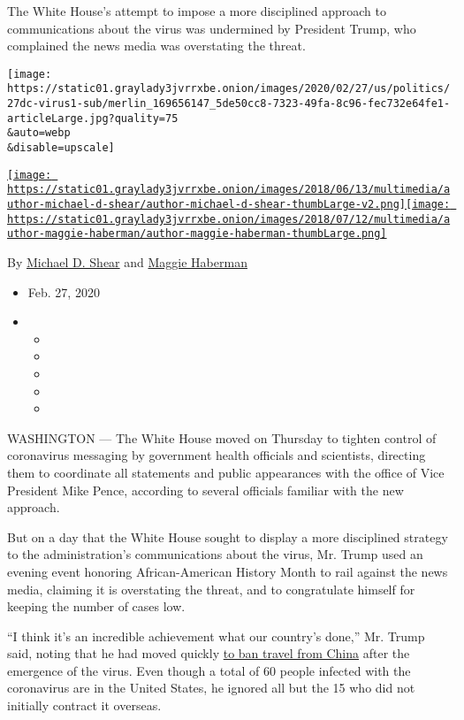 The White House's attempt to impose a more disciplined approach to
communications about the virus was undermined by President Trump, who
complained the news media was overstating the threat.

\texttt{[image: https://static01.graylady3jvrrxbe.onion/images/2020/02/27/us/politics/27dc-virus1-sub/merlin\_169656147\_5de50cc8-7323-49fa-8c96-fec732e64fe1-articleLarge.jpg?quality=75\\\&auto=webp\\\&disable=upscale]}

\href{https://www.nytimes3xbfgragh.onion/by/michael-d-shear}{\texttt{[image: https://static01.graylady3jvrrxbe.onion/images/2018/06/13/multimedia/author-michael-d-shear/author-michael-d-shear-thumbLarge-v2.png]}}\href{https://www.nytimes3xbfgragh.onion/by/maggie-haberman}{\texttt{[image: https://static01.graylady3jvrrxbe.onion/images/2018/07/12/multimedia/author-maggie-haberman/author-maggie-haberman-thumbLarge.png]}}

By \href{https://www.nytimes3xbfgragh.onion/by/michael-d-shear}{Michael
D. Shear} and
\href{https://www.nytimes3xbfgragh.onion/by/maggie-haberman}{Maggie
Haberman}

\begin{itemize}
\item
  Feb. 27, 2020
\item
  \begin{itemize}
  \item
  \item
  \item
  \item
  \item
  \end{itemize}
\end{itemize}

WASHINGTON --- The White House moved on Thursday to tighten control of
coronavirus messaging by government health officials and scientists,
directing them to coordinate all statements and public appearances with
the office of Vice President Mike Pence, according to several officials
familiar with the new approach.

But on a day that the White House sought to display a more disciplined
strategy to the administration's communications about the virus, Mr.
Trump used an evening event honoring African-American History Month to
rail against the news media, claiming it is overstating the threat, and
to congratulate himself for keeping the number of cases low.

``I think it's an incredible achievement what our country's done,'' Mr.
Trump said, noting that he had moved quickly
\href{https://www.nytimes3xbfgragh.onion/2020/01/31/business/china-travel-coronavirus.html}{to
ban travel from China} after the emergence of the virus. Even though a
total of 60 people infected with the coronavirus are in the United
States, he ignored all but the 15 who did not initially contract it
overseas.

